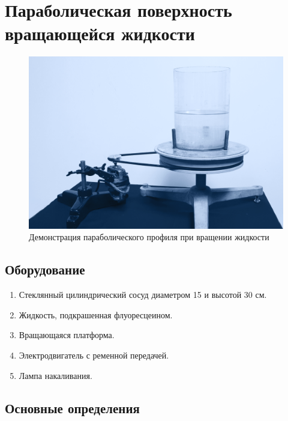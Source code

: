 \documentclass[All.tex]{subfiles}
\begin{document}


	\section{Параболическая поверхность вращающейся жидкости}


\begin{figure}[H]
	\centering 	
	\includegraphics[width=0.9\linewidth]{paraboloid-1.png}
	\caption{Демонстрация параболического профиля при вращении жидкости}
	\label{paraboloid-1}
\end{figure}

\subsection*{\textcolor{PineGreen}{Оборудование}}

\begin{enumerate}
	\item Стеклянный цилиндрический сосуд диаметром 15 и высотой 30 см.
	\item Жидкость, подкрашенная флуоресцеином.
	\item Вращающаяся платформа.
	\item Электродвигатель с ременной передачей.
	\item Лампа накаливания.
\end{enumerate}

\subsection*{\textcolor{PineGreen}{Основные определения}}
\end{document}
